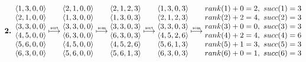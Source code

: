 %
\begin{align*}
  \text{\bf 2. }
  \begin{matrix}
    \langle 1, 3, 0, 0 \rangle \\
    \langle 2, 1, 0, 0 \rangle \\
    \langle 3, 3, 0, 0 \rangle \\
    \langle 4, 5, 0, 0 \rangle \\
    \langle 5, 6, 0, 0 \rangle \\
    \langle 6, 3, 0, 0 \rangle \\
  \end{matrix}
  \stackrel{\text{\tiny \tt sort}}{\longmapsto}
  \begin{matrix}
    \langle 2, 1, 0, 0 \rangle \\
    \langle 1, 3, 0, 0 \rangle \\
    \langle 3, 3, 0, 0 \rangle \\
    \langle 6, 3, 0, 0 \rangle \\
    \langle 4, 5, 0, 0 \rangle \\
    \langle 5, 6, 0, 0 \rangle \\
  \end{matrix}
  \stackrel{\text{\tiny \tt scan}}{\longmapsto}
  \begin{matrix}
    \langle 2, 1, 2, 3 \rangle \\
    \langle 1, 3, 0, 3 \rangle \\
    \langle 3, 3, 0, 3 \rangle \\
    \langle 6, 3, 0, 3 \rangle \\
    \langle 4, 5, 2, 6 \rangle \\
    \langle 5, 6, 1, 3 \rangle \\
  \end{matrix}
  \stackrel{\text{\tiny \tt sort}}{\longmapsto}
  \begin{matrix}
    \langle 1, 3, 0, 3 \rangle \\
    \langle 2, 1, 2, 3 \rangle \\
    \langle 3, 3, 0, 3 \rangle \\
    \langle 4, 5, 2, 6 \rangle \\
    \langle 5, 6, 1, 3 \rangle \\
    \langle 6, 3, 0, 3 \rangle \\
  \end{matrix}
  \stackrel{\text{\tiny \tt scan}}{\longmapsto}
  \begin{matrix}
    rank(1) + 0 = 2,\ succ(1) = 3 \\
    rank(2) + 2 = 4,\ succ(2) = 3 \\
    rank(3) + 0 = 0,\ succ(3) = 3 \\
    rank(4) + 2 = 4,\ succ(4) = 6 \\
    rank(5) + 1 = 3,\ succ(5) = 3 \\
    rank(6) + 0 = 1,\ succ(6) = 3 \\
  \end{matrix}
\end{align*}
